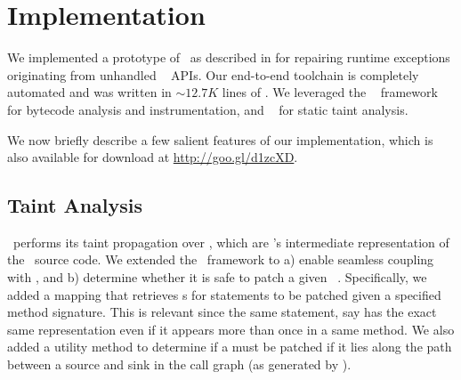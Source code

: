 \section{Implementation}
\label{sec:implementation}

We implemented a prototype of \tool\ as described in  for
repairing runtime exceptions originating from unhandled \java\ 
APIs. Our end-to-end toolchain is completely automated and was written in
$\sim$$12.7K$ lines of \java. We leveraged the \soot~\cite{soot} framework for
bytecode analysis and instrumentation, and \infoflow~\cite{infoflow} for static
taint analysis.

% 
% 
We now briefly describe a few salient features of our implementation, which is
also available for download at \url{http://goo.gl/d1zcXD}.

\subsection{Taint Analysis}

\infoflow\ performs its taint propagation over , which are \soot's
intermediate representation of the \java\ source code. We extended the
\infoflow\ framework to a) enable seamless coupling with \soot, and b) determine
whether it is safe to patch a given \soot\ . Specifically, we added
a mapping that retrieves s for statements to be patched given a
specified method signature. This is relevant since the same statement, say
 has the exact same representation even if it appears more
than once in a same method. We also added a utility method to determine if a
 must be patched if it lies along the path between a source and sink 
in the call graph (as generated by \soot).


